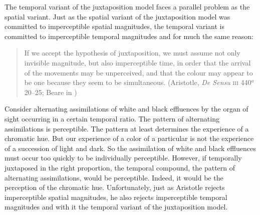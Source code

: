 The temporal variant of the juxtaposition model faces a parallel problem as the spatial variant. Just as the spatial variant of the juxtaposition model was committed to imperceptible spatial magnitudes, the temporal variant is committed to imperceptible temporal magnitudes and for much the same reason:
\begin{quote}
	If we accept the hypothesis of juxtaposition, we must assume not only invisible magnitude, but also imperceptible time, in order that the arrival of the movements may be unperceived, and that the colour may appear to be one because they seem to be simultaneous. (Aristotle, \emph{De Sensu} \textsc{iii} 440\( ^{a} \)20--25; Beare in \citealt[9]{Barnes:1984uq})
\end{quote}
Consider alternating assimilations of white and black effluences by the organ of sight occurring in a certain temporal ratio. The pattern of alternating assimilations is perceptible. The pattern at least determines the experience of a chromatic hue. But our experience of a color of a particular is not the experience of a succession of light and dark. So the assimilation of white and black effluences must occur too quickly to be individually perceptible. However, if temporally juxtaposed in the right proportion, the temporal compound, the pattern of alternating assimilations, would be perceptible.  Indeed, it would be the perception of the chromatic hue. Unfortunately, just as Aristotle rejects imperceptible spatial magnitudes, he also rejects imperceptible temporal magnitudes and with it the temporal variant of the juxtaposition model.


